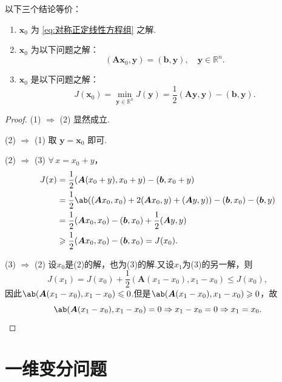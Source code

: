 \begin{theorem}
以下三个结论等价：
\begin{enumerate}
    \item $\bm{x}_0$ 为 \eqref{eq:对称正定线性方程组} 之解.
    \item $\bm{x}_0$ 为以下问题之解：
    \begin{equation}\label{eq:二次函数等价2}
        (\bm{A}\bm{x}_0, \bm{y}) = (\bm{b}, \bm{y}), \quad \bm{y} \in \mathbb{R}^n.
    \end{equation}
    \item $\bm{x}_0$ 是以下问题之解：
    \begin{equation}\label{eq:二次函数等价3}
        J(\bm{x}_0) = \min_{\bm{y} \in \mathbb{R}^n} J(\bm{y}) = \frac{1}{2}(\bm{A}\bm{y}, \bm{y}) - (\bm{b}, \bm{y}).
    \end{equation}
\end{enumerate}
\end{theorem}
\begin{proof}
(1) $\Longrightarrow$ (2) 显然成立.\par
(2) $\Longrightarrow$ (1) 取 $\bm{y} = \bm{x}_0$ 即可.\par
(2) $\Longrightarrow$ (3) $\forall\, x=x_0+y$，
\begin{align*}
    J(x)  &= \frac{1}{2}(\bm{A}(x_0+y), x_0+y) - (\bm{b}, x_0+y) \\
    &= \frac{1}{2}\ab((\bm{A}x_0, x_0) + 2(\bm{A}x_0, y) + (\bm{A}y, y)) - (\bm{b}, x_0) - (\bm{b}, y) \\
    &= \frac{1}{2}(\bm{A}x_0, x_0) - (\bm{b}, x_0) + \frac{1}{2}(\bm{A}y, y) \\
    &\geq \frac{1}{2}(\bm{A}x_0, x_0) - (\bm{b}, x_0) = J(x_0).
\end{align*}

(3) $\Longrightarrow$ (2) 设$x_0$是(2)的解，也为(3)的解.又设$x_1$为(3)的另一解，则
\begin{equation*}
    J(x_1)=J(x_0)+\frac{1}{2}(\bm{A}(x_1-x_0), x_1-x_0) \leq J(x_0),
\end{equation*}
因此$\ab(\bm{A}(x_1-x_0),x_1-x_0)\leq 0$.但是$\ab(\bm{A}(x_1-x_0),x_1-x_0)\geq 0$，故
\begin{equation*}
    \ab(\bm{A}(x_1-x_0),x_1-x_0)=0\Rightarrow x_1-x_0=0\Rightarrow x_1=x_0.\qedhere
\end{equation*}
\end{proof}

\section{一维变分问题}

